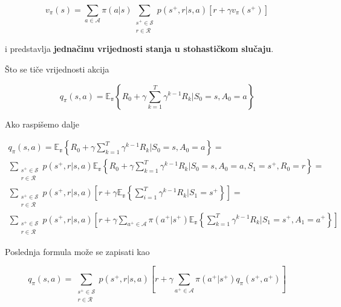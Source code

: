 \documentclass[12pt]{IEEEtran}
\numberwithin{equation}{subsection}
\numberwithin{figure}{subsection}
\theoremstyle{definition}
\numberwithin{example}{section}
\begin{document}
\begin{equation}
    v_{\pi}(s) = \sum_{a \in \mathcal{A}}{\pi(a | s) \sum_{\substack{s^{+} \in \mathcal{S}\\r \in \mathcal{R}}}{p(s^{+}, r | s, a) \left[r + \gamma v_{\pi}(s^{+}) \right]}}
\end{equation}

i predstavlja \textbf{jedna\v{c}inu vrijednosti stanja u stohasti\v{c}kom slu\v{c}aju}.

\v{S}to se ti\v{c}e vrijednosti akcija

\begin{equation}
    q_{\pi}(s, a) = \mathbb{E_{\pi}}\left\{R_{0} + \gamma \sum_{k = 1}^{T}{\gamma^{k - 1}R_{k}} | S_{0} = s, A_{0} = a\right\}
\end{equation}

Ako raspi\v{s}emo dalje

\begin{equation}
    \begin{gathered}
        q_{\pi}(s, a) = \mathbb{E_{\pi}}\left\{R_{0} + \gamma \sum_{k = 1}^{T}{\gamma^{k - 1}R_{k}} | S_{0} = s, A_{0} = a\right\} =\\
        \sum_{\substack{s^{+} \in \mathcal{S}\\r \in \mathcal{R}}}{p(s^{+}, r | s, a) \mathbb{E_{\pi}}\left\{ R_{0} + \gamma \sum_{k = 1}^{T}{\gamma^{k - 1} R_{k}} | S_{0} = s, A_{0} = a, S_{1} = s^{+}, R_{0} = r \right\}} =\\
        \sum_{\substack{s^{+} \in \mathcal{S}\\r \in \mathcal{R}}}{p(s^{+}, r | s, a) \left[ r + \gamma \mathbb{E_{\pi}}\left\{ \sum_{i = 1}^{T}{\gamma^{k - 1}R_{k}} | S_{1} = s^{+} \right\} \right]} =\\
        \sum_{\substack{s^{+} \in \mathcal{S}\\r \in \mathcal{R}}}{p(s^{+}, r | s, a) \left[ r + \gamma \sum_{a^{+} \in \mathcal{A}}{\pi(a^{+} | s^{+}) \mathbb{E_{\pi}}\left\{ \sum_{k = 1}^{T}{\gamma^{k - 1}R_{k}} | S_{1} = s^{+}, A_{1} = a^{+} \right\}}\right]}
    \end{gathered}
\end{equation}

Poslednja formula mo\v{z}e se zapisati kao

\begin{equation}
    q_{\pi}(s, a) = \sum_{\substack{s^{+} \in \mathcal{S}\\r \in \mathcal{R}}}{p(s^{+}, r | s, a) \left[ r + \gamma \sum_{a^{+} \in \mathcal{A}}{\pi(a^{+} | s^{+})q_{\pi}(s^{+}, a^{+})} \right] }
\end{equation}
\end{document}
